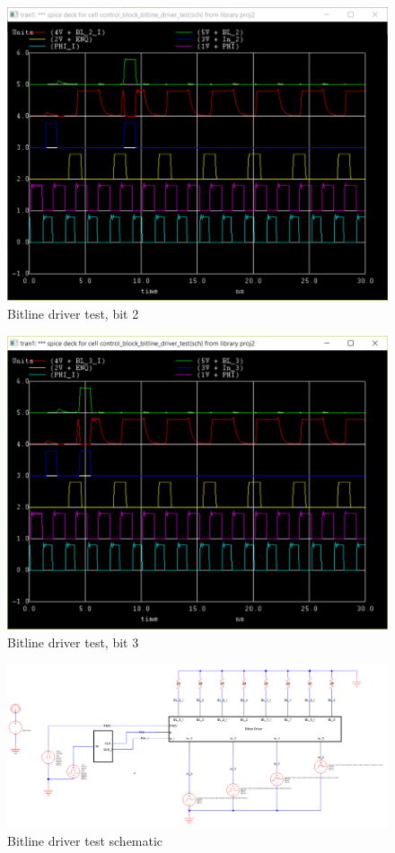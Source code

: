 \documentclass[12pt]{report}
\begin{document}
\begin{figure}[H]
  \centering
    \includegraphics[width=1.0\textwidth]{control_block_bitline_driver_test_2.PNG}
  \caption{Bitline driver test, bit 2}
  \label{fig:control_block_bitline_driver_test}
\end{figure}
\begin{figure}[H]
  \centering
    \includegraphics[width=1.0\textwidth]{control_block_bitline_driver_test_3.PNG}
  \caption{Bitline driver test, bit 3}
  \label{fig:control_block_bitline_driver_test}
\end{figure}
\begin{figure}[H]
  \centering
    \includegraphics[width=1.0\textwidth]{TestSchematics/bitline_driver.PNG}
  \caption{Bitline driver test schematic}
\end{figure}
\end{document}
